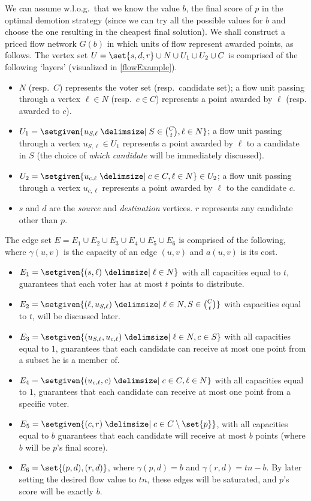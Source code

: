 \documentclass[letterpaper]{article} %
\newcommand{\Cmp}{C \setminus \set{p}}
\begin{document}
We can assume w.l.o.g.\ that we know the value $b$, the final score of $p$ in the optimal demotion strategy (since we can try all the possible values for $b$ and choose the one resulting in the cheapest final solution).
We shall construct a priced flow network $G(b)$ in which units of flow represent awarded points, as follows. The vertex set  $U = \set{s,d,r} \cup N \cup U_1 \cup U_2 \cup C$ is comprised of the following `layers' (visualized in \cref{flowExample}).
\begin{itemize}
    \item $N$ (resp.\ $C$) represents the voter set (resp.\ candidate set); a flow unit passing through a vertex $\ell \in N$ (resp.\ $c \in C$) represents a point awarded by $\ell$ (resp. awarded to $c$).
    \item $U_1 = \setgiven{u_{S,\ell} \given S \in \binom{C}{t}, \ell \in N}$; a flow unit passing through a vertex $u_{S,\ell} \in U_1$ represents a point awarded by $\ell$ to a candidate in $S$ (the choice of \emph{which candidate} will be immediately discussed).
    \item $U_2 = \setgiven{u_{c,\ell} \given c \in C, \ell \in N} \in U_2$; a flow unit passing through a vertex $u_{c,\ell}$ represents a point awarded by $\ell$ to the candidate $c$.
    \item $s$ and $d$ are the \emph{source} and \emph{destination} vertices. $r$ represents any candidate other than $p$.
\end{itemize}
The edge set $E=E_1 \cup E_2 \cup E_3 \cup E_4 \cup E_5 \cup E_6$ is comprised of the following, where $\gamma(u,v)$ is the capacity of an edge $(u,v)$ and  $a(u,v)$ is its cost.
\begin{itemize}
    \item $E_1=\setgiven{(s,\ell) \given \ell \in N}$ with all capacities equal to $t$, guarantees that each voter has at most $t$ points to distribute.
    \item $E_2= \setgiven{(\ell, u_{S,\ell})\given \ell \in N, S \in \binom{C}{t}}$ with capacities equal to $t$, will be discussed later.
    \item $E_3=\setgiven{(u_{S,\ell}, u_{c,\ell})\given \ell \in N, c \in S}$ with all capacities equal to $1$, guarantees that each candidate can receive at most one point from a subset he is a member of.
    \item $E_4= \setgiven{(u_{c,\ell},c) \given c \in C, \ell \in N}$ with all capacities equal to $1$, guarantees that each candidate can receive at most one point from a specific voter.
    \item $E_5= \setgiven{(c,r) \given c \in \Cmp}$, with all capacities equal to $b$ guarantees that each candidate will receive at most $b$ points (where $b$ will be $p$'s final score).
    \item $E_6= \set{(p,d),(r,d)}$, where $\gamma(p,d)=b$ and $\gamma(r,d)=tn-b$. By later setting the desired flow value to $tn$, these edges will be saturated, and $p$'s score will be exactly $b$.
\end{itemize}
\end{document}
